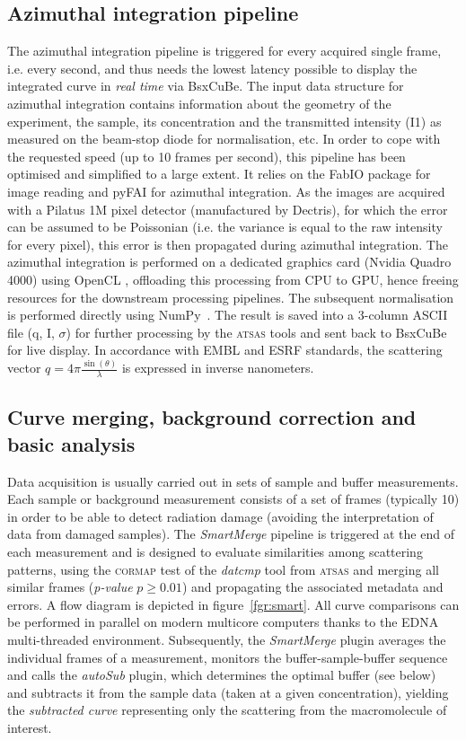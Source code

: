 \documentclass[preprint,pdf]{iucr}              %
\begin{document}
\subsection{Azimuthal integration pipeline}
\label{AI}
The azimuthal integration pipeline is triggered for every acquired single frame,
i.e. every second, and thus needs the lowest latency possible to
display the integrated curve in \textit{real time} via BsxCuBe.
The input data structure for azimuthal integration contains
information about the geometry of the experiment, the sample, its concentration
and the transmitted intensity (I1) as measured on the beam-stop diode for
normalisation, etc.
In order to cope with the requested speed (up to 10 frames per second), this
pipeline has been optimised and simplified to a large extent.
It relies on the FabIO \cite{fabio} package for image reading and pyFAI
\cite{pyFAI} for azimuthal integration.
As the images are acquired with a Pilatus 1M pixel detector (manufactured by
Dectris), for which the error can be assumed to be Poissonian
(i.e. the variance is equal to the raw intensity for every pixel), this error is
then propagated during azimuthal integration.
The azimuthal integration is performed on a dedicated graphics card
(Nvidia Quadro 4000) using OpenCL \cite{pyFAI_gpu}, offloading this processing
from CPU to GPU, hence freeing resources for the downstream processing pipelines.
The subsequent normalisation is performed directly using NumPy~\cite{numpy}.
The result is saved into a 3-column ASCII file (q, I, $\sigma$) for further
processing by the \textsc{atsas} tools \cite{ATSAS2} and sent back to BsxCuBe
for live display.
In accordance with EMBL and ESRF standards, the scattering vector
$q=4\pi\frac{\sin(\theta)}{\lambda}$ is expressed in inverse nanometers.

\subsection{Curve merging, background correction and basic analysis}
\label{SM}
Data acquisition is usually carried out in sets of sample and buffer
measurements.
Each sample or background measurement consists of a set of frames
(typically 10) in order to be able to detect radiation damage
(avoiding the interpretation of data from damaged samples).
The \textit{SmartMerge} pipeline is triggered at the end of each measurement
and is designed to evaluate similarities among scattering
patterns, using the \textsc{cormap} test \cite{CORMAP} of the \textit{datcmp} tool from \textsc{atsas} and merging all
similar frames (\textit{p-value} $p \geq 0.01$) and  propagating the associated
metadata and errors.
A flow diagram is depicted in figure~\ref{fgr:smart}.
All curve comparisons can be performed in parallel on modern multicore
computers thanks to the EDNA multi-threaded environment.
Subsequently, the \textit{SmartMerge} plugin averages the individual frames
of a measurement, monitors the buffer-sample-buffer sequence and
calls the \textit{autoSub} plugin, which determines the optimal buffer
(see below) and subtracts it from the sample data (taken at a given
concentration), yielding the \textit{subtracted curve} representing only the
scattering from the macromolecule of interest.
\end{document}
